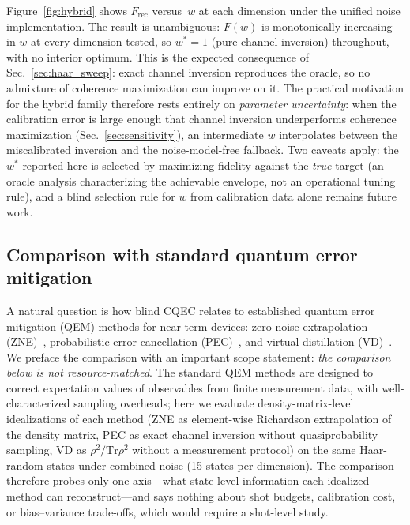 \documentclass[a4paper,onecolumn]{quantumarticle}
\newcommand{\tr}{\mathrm{Tr}}
\newcommand{\Frec}{F_\mathrm{rec}}
\begin{document}
Figure~\ref{fig:hybrid} shows $\Frec$ versus~$w$ at each dimension under the unified noise implementation.
The result is unambiguous: $F(w)$ is monotonically increasing in $w$ at every dimension tested, so $w^* = 1$ (pure channel inversion) throughout, with no interior optimum.
This is the expected consequence of Sec.~\ref{sec:haar_sweep}: exact channel inversion reproduces the oracle, so no admixture of coherence maximization can improve on it.
The practical motivation for the hybrid family therefore rests entirely on \emph{parameter uncertainty}: when the calibration error is large enough that channel inversion underperforms coherence maximization (Sec.~\ref{sec:sensitivity}), an intermediate $w$ interpolates between the miscalibrated inversion and the noise-model-free fallback.
Two caveats apply: the $w^*$ reported here is selected by maximizing fidelity against the \emph{true} target (an oracle analysis characterizing the achievable envelope, not an operational tuning rule), and a blind selection rule for $w$ from calibration data alone remains future work.


\subsection{Comparison with standard quantum error mitigation}
\label{sec:qem_compare}

A natural question is how blind CQEC relates to established quantum error mitigation (QEM) methods for near-term devices: zero-noise extrapolation (ZNE)~\cite{Temme2017,Li2017}, probabilistic error cancellation (PEC)~\cite{Temme2017,Endo2018}, and virtual distillation (VD)~\cite{Koczor2021,Huggins2021}.
We preface the comparison with an important scope statement: \emph{the comparison below is not resource-matched}.
The standard QEM methods are designed to correct expectation values of observables from finite measurement data, with well-characterized sampling overheads; here we evaluate density-matrix-level idealizations of each method (ZNE as element-wise Richardson extrapolation of the density matrix, PEC as exact channel inversion without quasiprobability sampling, VD as $\rho^2/\tr\rho^2$ without a measurement protocol) on the same Haar-random states under combined noise (15 states per dimension).
The comparison therefore probes only one axis---what state-level information each idealized method can reconstruct---and says nothing about shot budgets, calibration cost, or bias--variance trade-offs, which would require a shot-level study.
\end{document}
